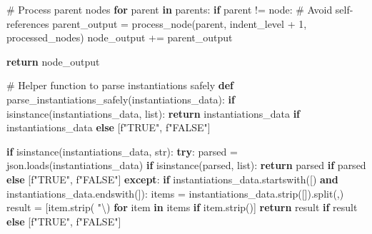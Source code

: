 \documentclass[
  11pt,
  letterpaper,
]{book}
\newenvironment{Shaded}{\begin{snugshade}}{\end{snugshade}}
\newcommand{\BuiltInTok}[1]{\textcolor[rgb]{0.00,0.23,0.31}{#1}}
\newcommand{\CharTok}[1]{\textcolor[rgb]{0.13,0.47,0.30}{#1}}
\newcommand{\CommentTok}[1]{\textcolor[rgb]{0.37,0.37,0.37}{#1}}
\newcommand{\ControlFlowTok}[1]{\textcolor[rgb]{0.00,0.23,0.31}{\textbf{#1}}}
\newcommand{\DecValTok}[1]{\textcolor[rgb]{0.68,0.00,0.00}{#1}}
\newcommand{\KeywordTok}[1]{\textcolor[rgb]{0.00,0.23,0.31}{\textbf{#1}}}
\newcommand{\NormalTok}[1]{\textcolor[rgb]{0.00,0.23,0.31}{#1}}
\newcommand{\OperatorTok}[1]{\textcolor[rgb]{0.37,0.37,0.37}{#1}}
\newcommand{\SpecialStringTok}[1]{\textcolor[rgb]{0.13,0.47,0.30}{#1}}
\newcommand{\StringTok}[1]{\textcolor[rgb]{0.13,0.47,0.30}{#1}}
\begin{document}
\begin{Shaded}
\begin{Highlighting}[]
      \CommentTok{\# Process parent nodes}
      \ControlFlowTok{for}\NormalTok{ parent }\KeywordTok{in}\NormalTok{ parents:}
          \ControlFlowTok{if}\NormalTok{ parent }\OperatorTok{!=}\NormalTok{ node:  }\CommentTok{\# Avoid self{-}references}
\NormalTok{              parent\_output }\OperatorTok{=}\NormalTok{ process\_node(parent, indent\_level }\OperatorTok{+} \DecValTok{1}\NormalTok{, processed\_nodes)}
\NormalTok{              node\_output }\OperatorTok{+=}\NormalTok{ parent\_output}

      \ControlFlowTok{return}\NormalTok{ node\_output}

  \CommentTok{\# Helper function to parse instantiations safely}
  \KeywordTok{def}\NormalTok{ parse\_instantiations\_safely(instantiations\_data):}
      \ControlFlowTok{if} \BuiltInTok{isinstance}\NormalTok{(instantiations\_data, }\BuiltInTok{list}\NormalTok{):}
          \ControlFlowTok{return}\NormalTok{ instantiations\_data }\ControlFlowTok{if}\NormalTok{ instantiations\_data }\ControlFlowTok{else}\NormalTok{ [}\SpecialStringTok{f"TRUE"}\NormalTok{, }\SpecialStringTok{f"FALSE"}\NormalTok{]}

      \ControlFlowTok{if} \BuiltInTok{isinstance}\NormalTok{(instantiations\_data, }\BuiltInTok{str}\NormalTok{):}
          \ControlFlowTok{try}\NormalTok{:}
\NormalTok{              parsed }\OperatorTok{=}\NormalTok{ json.loads(instantiations\_data)}
              \ControlFlowTok{if} \BuiltInTok{isinstance}\NormalTok{(parsed, }\BuiltInTok{list}\NormalTok{):}
                  \ControlFlowTok{return}\NormalTok{ parsed }\ControlFlowTok{if}\NormalTok{ parsed }\ControlFlowTok{else}\NormalTok{ [}\SpecialStringTok{f"TRUE"}\NormalTok{, }\SpecialStringTok{f"FALSE"}\NormalTok{]}
          \ControlFlowTok{except}\NormalTok{:}
              \ControlFlowTok{if}\NormalTok{ instantiations\_data.startswith(}\StringTok{\textquotesingle{}[\textquotesingle{}}\NormalTok{) }\KeywordTok{and}\NormalTok{ instantiations\_data.endswith(}\StringTok{\textquotesingle{}]\textquotesingle{}}\NormalTok{):}
\NormalTok{                  items }\OperatorTok{=}\NormalTok{ instantiations\_data.strip(}\StringTok{\textquotesingle{}[]\textquotesingle{}}\NormalTok{).split(}\StringTok{\textquotesingle{},\textquotesingle{}}\NormalTok{)}
\NormalTok{                  result }\OperatorTok{=}\NormalTok{ [item.strip(}\StringTok{\textquotesingle{} "}\CharTok{\textbackslash{}\textquotesingle{}}\StringTok{\textquotesingle{}}\NormalTok{) }\ControlFlowTok{for}\NormalTok{ item }\KeywordTok{in}\NormalTok{ items }\ControlFlowTok{if}\NormalTok{ item.strip()]}
                  \ControlFlowTok{return}\NormalTok{ result }\ControlFlowTok{if}\NormalTok{ result }\ControlFlowTok{else}\NormalTok{ [}\SpecialStringTok{f"TRUE"}\NormalTok{, }\SpecialStringTok{f"FALSE"}\NormalTok{]}


\end{Highlighting}
\end{Shaded}
\end{document}
